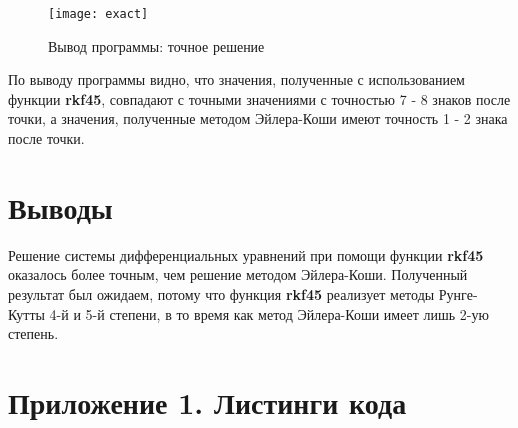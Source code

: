\begin{figure}[H]
    \centering
    \texttt{[image: exact]}
    \caption{Вывод программы: точное решение}
    \label{pic:demo2}
\end{figure} 

По выводу программы видно, что значения, полученные с использованием функции \textbf{rkf45}, совпадают с точными значениями с точностью 7 - 8 знаков после точки, а значения, полученные методом Эйлера-Коши имеют точность 1 - 2 знака после точки. 

\section{Выводы}

Решение системы дифференциальных уравнений при помощи функции \textbf{rkf45} оказалось более точным, чем решение методом Эйлера-Коши. Полученный результат был ожидаем, потому что функция \textbf{rkf45} реализует методы Рунге-Кутты 4-й и 5-й степени, в то время как метод Эйлера-Коши имеет лишь 2-ую степень.

\newpage

\section*{Приложение 1. Листинги кода}


\parindent=1cm


\parindent=1cm


